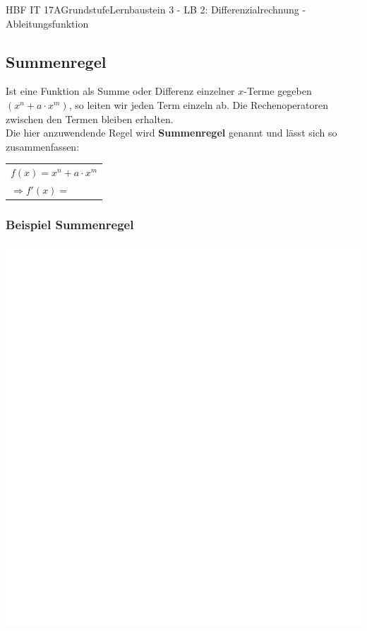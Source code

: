 \documentclass[11pt,twocolumn,oneside,openany,headings=optiontotoc,11pt,numbers=noenddot]{article}
\begin{document}
\begin{worksheet}{HBF IT 17A}{Grundstufe}{Lernbaustein 3 - LB 2: Differenzialrechnung - Ableitungsfunktion}
		\subsection{Summenregel}
		Ist eine Funktion als Summe oder Differenz einzelner \(x\)-Terme gegeben \((x^n + a\cdot x^m)\), so leiten wir jeden Term einzeln ab. Die Rechenoperatoren zwischen den Termen bleiben erhalten.\\
		Die hier anzuwendende Regel wird \textbf{Summenregel} genannt und lässt sich so zusammenfassen:
		\begin{framed}
			\noindent
			\begin{tabularx}{0.8\textwidth}{X}
				\(f(x) = x^n + a\cdot x^m\)\\
				\(\Rightarrow f'(x) = \)
			\end{tabularx}
		\end{framed}
	
		\subsubsection*{Beispiel Summenregel}
		\includegraphics[scale=0.2]{../empty.jpg}\\
		\\

\end{worksheet}
\end{document}
